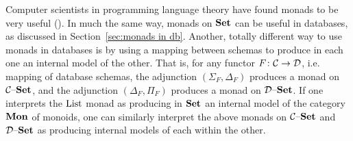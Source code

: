 \documentclass[CT4S-EN-RU]{subfiles}
\begin{document}
\begin{blockENG}
Computer scientists in programming language theory have found monads to be very useful (\cite{Mog}). In much the same way, monads on ${\mathbf{Set}}$ can be useful in databases, as discussed in Section~\ref{sec:monads in db}. Another, totally different way to use monads in databases is by using a mapping between schemas to produce in each one an internal model of the other. That is, for any functor $F\colon\mathcal{C}\rightarrow\mathcal{D}$, i.e. mapping of database schemas, the adjunction $(\Sigma_F,\Delta_F)$ produces a monad on $\mathcal{C}{\text \textendash}{\mathbf{Set}}$, and the adjunction $(\Delta_F,\Pi_F)$ produces a monad on $\mathcal{D}{\text \textendash}{\mathbf{Set}}$. If one interprets the $\textnormal{List}$ monad as producing in ${\mathbf{Set}}$ an internal model of the category ${\mathbf{Mon}}$ of monoids, one can similarly interpret the above monads on $\mathcal{C}{\text \textendash}{\mathbf{Set}}$ and $\mathcal{D}{\text \textendash}{\mathbf{Set}}$ as producing internal models of each within the other.
\end{blockENG}

\begin{blockRUS}
\end{blockRUS}
\end{document}
